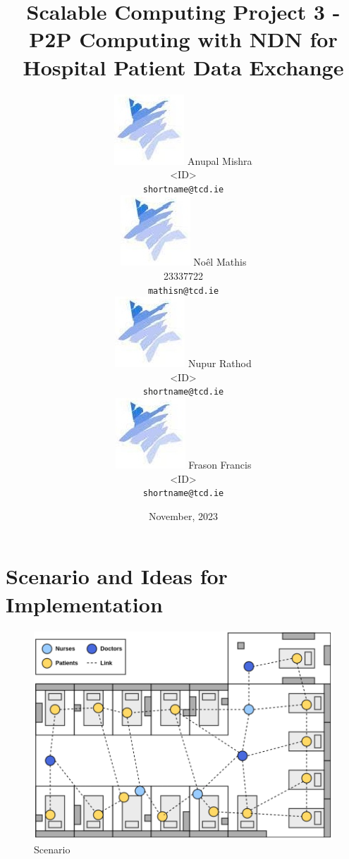 \documentclass{article}
\title{Scalable Computing Project 3 - P2P Computing with NDN for Hospital Patient Data Exchange}
\date{November, 2023}
\author{ 
{\includegraphics[scale=0.2]{star.png}\hspace{1mm}
        Anupal Mishra	                     }\\
	<ID>          \\
	\texttt{shortname@tcd.ie}            \\
\And
{\includegraphics[scale=0.2]{star.png}\hspace{1mm}
        Noêl Mathis	                 	 }\\
	23337722                          \\
	\texttt{mathisn@tcd.ie}            \\
\And
{\includegraphics[scale=0.2]{star.png}\hspace{1mm}
        Nupur Rathod		             	 }\\
 	<ID>                                  \\
	\texttt{shortname@tcd.ie}            \\
\And
{\includegraphics[scale=0.2]{star.png}\hspace{1mm}
        Frason Francis      	         	 }\\
	<ID>                                  \\
	\texttt{shortname@tcd.ie}            \\
}
\begin{document}
\maketitle
\section{Scenario and Ideas for Implementation}

\begin{figure}[H]
	\centering
        \includegraphics[scale=0.4]{media/scenario.png}
	\caption{Scenario}
	\label{fig:scenario_graphic}
\end{figure}





 



















\end{document}

